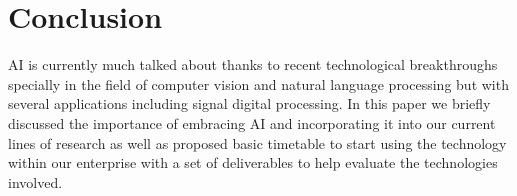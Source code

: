 \section{Conclusion}

AI is currently much talked about thanks to recent technological breakthroughs specially in the field of computer vision and natural language processing but with several applications including signal digital processing. In this paper we briefly discussed the importance of embracing AI and incorporating it into our current lines of research as well as proposed basic timetable to start using the technology within our enterprise with a set of deliverables to help evaluate the technologies involved.
